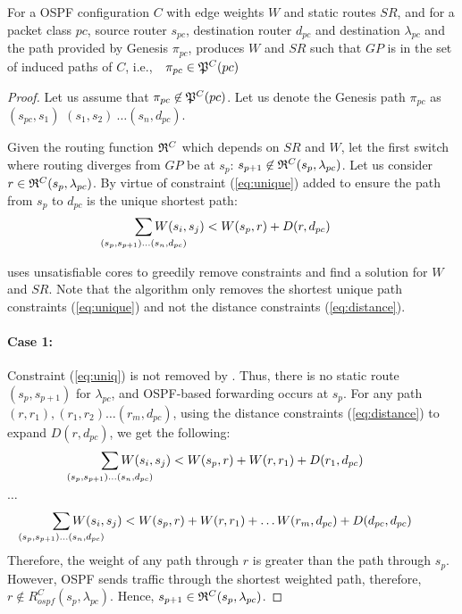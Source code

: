 \begin{corollary}
	For a OSPF configuration $C$ with edge weights $W$ and
	static routes $SR$, and for a packet class $pc$, source router $s_{pc}$, destination router $d_{pc}$ and destination $\lambda_{pc}$ and the path provided by Genesis $\pi_{pc}$,  produces $W$ and $SR$ 
	such that $GP$	is in the set of induced paths of $C$, i.e., $~~\pi_{pc} \in \mathfrak{P}^C(pc)$
\end{corollary}
\begin{proof}
Let us assume that $\pi_{pc} \not\in \mathfrak{P}^C(pc)$. 
Let us denote the 
Genesis path $\pi_{pc}$ as $(s_{pc}, s_1)$ $ (s_1, s_2) \
\ldots (s_n, d_{pc})$. 

Given the routing function $\mathfrak{R}^C$ which depends on $SR$ and
$W$, let the first switch where routing diverges from $GP$ be at $s_p$: 
$s_{p+1} \not\in \mathfrak{R}^C(s_{p}, \lambda_{pc})$. Let us consider  $r \in \mathfrak{R}^C(s_{p}, \lambda_{pc})$. By virtue of
constraint (\ref{eq:unique}) added to ensure the path from $s_{p}$
to $d_{pc}$ is the unique shortest path: 
\begin{equation} \label{eq:uniq}
\sum_{\mathclap{\substack{(s_{p},s_{p+1})\ldots(s_{n},d_{pc})}}} 
W(s_i, s_j) < W(s_{p}, r) + D(r, d_{pc})
\end{equation}

 uses unsatisfiable cores to greedily remove 
constraints and find a solution for $W$ and $SR$. Note that 
the algorithm only removes the shortest unique path 
constraints (\ref{eq:unique}) and 
not the distance constraints (\ref{eq:distance}).
\paragraph{Case 1:} Constraint (\ref{eq:uniq}) is not removed by 
\Cref{alg:unsat}. Thus, there is no static route $(s_p, s_{p+1})$ for
$\lambda_{pc}$, and OSPF-based forwarding occurs at $s_{p}$. 
For any path $(r, r_1), (r_1, r_2) \ldots (r_m, d_{pc})$, 
using the distance constraints (\ref{eq:distance}) to
expand $D(r, d_{pc})$, we get the following: 
\[
\sum_{\mathclap{\substack{(s_{p},s_{p+1})\ldots(s_{n},d_{pc})}}} 
W(s_i, s_j) < W(s_{p}, r) + W(r, r_{1}) + D(r_{1}, d_{pc})
\]
\begin{center}
	$\ldots$
\end{center}
\[
\sum_{\mathclap{\substack{(s_{p},s_{p+1})\ldots(s_{n},d_{pc})}}} 
W(s_i, s_j) < W(s_{p}, r) + W(r, r_{1}) + \ldots W(r_{m}, d_{pc}) + D(d_{pc}, d_{pc})
\]
Therefore, the weight of any path through $r$ is greater than 
the path through $s_{p}$. However, 
OSPF sends traffic through the shortest weighted
path, therefore, $r \not\in R^C_{ospf}(s_p, \lambda_{pc})$. Hence, 
$s_{p+1} \in \mathfrak{R}^C(s_{p}, \lambda_{pc})$.


\end{proof}
